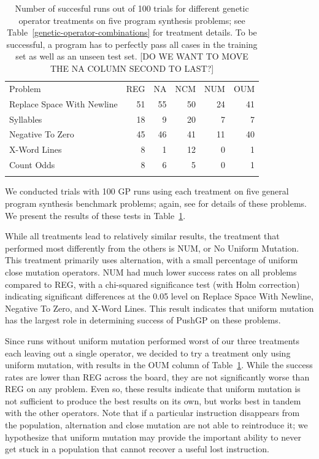 \documentclass[graybox]{svmult}
\begin{document}
\begin{table}[t]
\centering
\label{genetic-operator-results}
\caption{Number of succesful runs out of 100 trials for different genetic operator treatments on five program synthesis problems; see Table~\ref{genetic-operator-combinations} for treatment details. To be successful, a program has to perfectly pass all cases in the training set as well as an unseen test set. [DO WE WANT TO MOVE THE NA COLUMN SECOND TO LAST?]}
\begin{tabular}{l r r r r r}
\hline\noalign{\smallskip}
Problem                    & REG & NA & NCM & NUM & OUM \\
\noalign{\smallskip}\svhline\noalign{\smallskip}
Replace Space With Newline &  51 & 55 &  50 &  24 &  41 \\
Syllables                  &  18 &  9 &  20 &   7 &   7 \\
Negative To Zero           &  45 & 46 &  41 &  11 &  40 \\
X-Word Lines               &   8 &  1 &  12 &   0 &   1 \\
Count Odds                 &   8 &  6 &   5 &   0 &   1 \\
\noalign{\smallskip}\hline\noalign{\smallskip}
\end{tabular}
\end{table}

We conducted trials with 100 GP runs using each treatment on five general program synthesis benchmark problems; again, see \cite{Helmuth:2015:GECCO} for details of these problems. We present the results of these tests in Table~\ref{genetic-operator-results}.

While all treatments lead to relatively similar results, the treatment that performed most differently from the others is NUM, or No Uniform Mutation. This treatment primarily uses alternation, with a small percentage of uniform close mutation operators. NUM had much lower success rates on all problems compared to REG, with a chi-squared significance test (with Holm correction) indicating significant differences at the 0.05 level on Replace Space With Newline, Negative To Zero, and X-Word Lines. This result indicates that uniform mutation has the largest role in determining success of PushGP on these problems.

Since runs without uniform mutation performed worst of our three treatments each leaving out a single operator, we decided to try a treatment only using uniform mutation, with results in the OUM column of Table~\ref{genetic-operator-results}. While the success rates are lower than REG across the board, they are not significantly worse than REG on any problem. Even so, these results indicate that uniform mutation is not sufficient to produce the best results on its own, but works best in tandem with the other operators. Note that if a particular instruction disappears from the population, alternation and close mutation are not able to reintroduce it; we hypothesize that uniform mutation may provide the important ability to never get stuck in a population that cannot recover a useful lost instruction.
\end{document}
